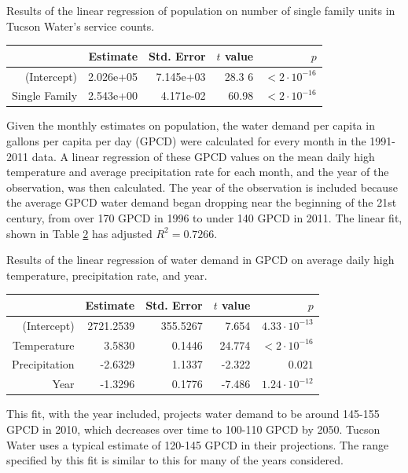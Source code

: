 \documentclass[opre,nonblindrev]{informs3} %
\begin{document}
\begin{table}
	\TABLE
	{
		Results of the linear regression of population on number of single family units in Tucson Water's service counts.
		\label{tb:population_linear_reg}
	}
	{\begin{tabular}{rrrrr}
		\hline
						   & Estimate  & Std. Error & $t$ value & $p$ \\
		\hline
		(Intercept)    & 2.026e+05 & 7.145e+03  & 28.3 6    & $<2 \cdot 10^{-16}$ \\
		Single Family  & 2.543e+00 & 4.171e-02  & 60.98     & $<2 \cdot 10^{-16}$ \\
		\hline
	\end{tabular}}
	{}
\end{table}

Given the monthly estimates on population, the water demand per capita in gallons per capita per day (GPCD) were calculated for every month in the 1991-2011 data.
A linear regression of these GPCD values on the mean daily high temperature and average precipitation rate for each month, and the year of the observation, was then calculated.
The year of the observation is included because the average GPCD water demand began dropping near the beginning of the 21st century, from over 170 GPCD in 1996 to under 140 GPCD in 2011.
The linear fit, shown in Table \ref{tb:gpcd_linear_reg} has adjusted $R^2 = 0.7266$.

\begin{table}
	\TABLE
	{
		Results of the linear regression of water demand in GPCD on average daily high temperature, precipitation rate, and year.
		\label{tb:gpcd_linear_reg}
	}
	{\begin{tabular}{rrrrr}
		\hline
						   & Estimate  & Std. Error & $t$ value & $p$ \\
		\hline
		(Intercept)    & 2721.2539 & 355.5267   & 7.654     & $4.33\cdot 10^{-13}$ \\
		Temperature    &   3.5830  & 0.1446     & 24.774    & $< 2\cdot 10^{-16}$\\
		Precipitation  &  -2.6329  & 1.1337     & -2.322    & $0.021$ \\
		Year           &  -1.3296  & 0.1776     & -7.486    & $1.24\cdot 10^{-12}$ \\
		\hline
	\end{tabular}}
	{}
\end{table}

This fit, with the year included, projects water demand to be around 145-155 GPCD in 2010, which decreases over time to 100-110 GPCD by 2050.
Tucson Water uses a typical estimate of 120-145 GPCD in their projections.
The range specified by this fit is similar to this for many of the years considered.
\end{document}
